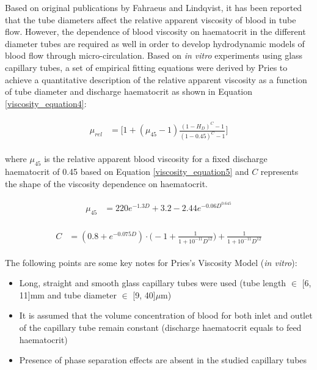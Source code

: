 \noindent Based on original publications by Fahraeus and Lindqvist\cite{Fahrus1931THETUBES}, it has been reported that the tube diameters affect the relative apparent viscosity of blood in tube flow. However, the dependence of blood viscosity on haematocrit in the different diameter tubes are required as well in order to develop hydrodynamic models of blood flow through micro-circulation. Based on \textit{in vitro} experiments using glass capillary tubes, a set of empirical fitting equations were derived by Pries\cite{Pries1992BloodHematocrit} to achieve a quantitative description of the relative apparent viscosity as a function of tube diameter and discharge haematocrit as shown in Equation \ref{viscosity_equation4}:

\begin{eqnarray}
\label{viscosity_equation4}
\begin{aligned}
\mu_{rel} & = \bigg[1 + (\mu_{45} - 1) \frac{(1-H_{D})^{C} - 1}{(1-0.45)^{C} - 1} \bigg]
\end{aligned}
\end{eqnarray}

\bigskip

\noindent where $\mu_{45}$ is the relative apparent blood viscosity for a fixed discharge haematocrit of 0.45 based on Equation \ref{viscosity_equation5} and $C$ represents the shape of the viscosity dependence on haematocrit. 

\begin{eqnarray}
\label{viscosity_equation5}
\begin{aligned}
\mu_{45} & = 220 e^{-1.3D} + 3.2 - 2.44e^{-0.06D^{0.645}}
\end{aligned}
\end{eqnarray}

\begin{eqnarray}
\label{viscosity_equation3}
\begin{aligned}
C & = (0.8 + e^{-0.075D}) \cdot \bigg(-1 + \frac{1}{1 + 10^{-11}D^{12}} \bigg) + \frac{1}{1 + 10^{-11}D^{12}}
\end{aligned}
\end{eqnarray}

\bigskip
\newpage

\noindent The following points are some key notes for Pries's Viscosity Model (\textit{in vitro}):\cite{Pries1992BloodHematocrit}
\begin{itemize}
    \item Long, straight and smooth glass capillary tubes were used (tube length $\in$ [6, 11]mm and tube diameter $\in$ [9, 40]$\mu$m)
    \item It is assumed that the volume concentration of blood for both inlet and outlet of the capillary tube remain constant (discharge haematocrit equals to feed haematocrit)
    \item Presence of phase separation effects are absent in the studied capillary tubes
\end{itemize}

